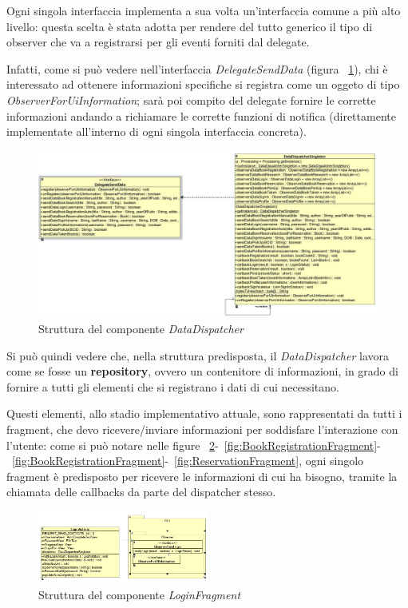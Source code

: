 Ogni singola interfaccia implementa a sua volta un'interfaccia comune a più alto livello: questa scelta è stata adotta per rendere del tutto generico il tipo di observer che va a registrarsi per gli eventi forniti dal delegate.

Infatti, come si può vedere nell'interfaccia \textit{DelegateSendData} (figura ~\ref{fig:DataDispatcher}), chi è interessato ad ottenere informazioni specifiche si registra come un oggeto di tipo \textit{ObserverForUiInformation}; sarà poi compito del delegate fornire le corrette informazioni andando a richiamare le corrette funzioni di notifica (direttamente implementate all'interno di ogni singola interfaccia concreta).

\begin{figure}[h!]
	\centering
	\includegraphics[width=\textwidth]{Immagini/ClassDiagramDispatcherDelegate}
	\caption{Struttura del componente \textit{DataDispatcher}}
	\label{fig:DataDispatcher}
\end{figure}

Si può quindi vedere che, nella struttura predisposta, il \textit{DataDispatcher} lavora come se fosse un \textbf{repository}, ovvero un contenitore di informazioni, in grado di fornire a tutti gli elementi che si registrano i dati di cui necessitano.

Questi elementi, allo stadio implementativo attuale, sono rappresentati da tutti i fragment, che devo ricevere/inviare informazioni per soddisfare l'interazione con l'utente: come si può notare nelle figure ~\ref{fig:LoginFragment}-~\ref{fig:BookRegistrationFragment}-~\ref{fig:BookRegistrationFragment}-~\ref{fig:ReservationFragment}, ogni singolo fragment è predisposto per ricevere le informazioni di cui ha bisogno, tramite la chiamata delle callbacks da parte del dispatcher stesso.


\begin{figure}[h!]
	\centering
	\includegraphics[width=0.5\textwidth]{Immagini/LoginFragment}
	\caption{Struttura del componente \textit{LoginFragment}}
	\label{fig:LoginFragment}
\end{figure}



